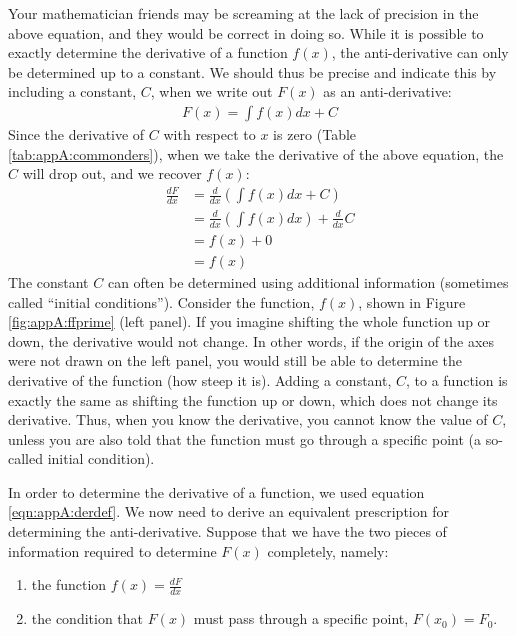 Your mathematician friends may be screaming at the lack of precision in the above equation, and they would be correct in doing so. While it is possible to exactly determine the derivative of a function $f(x)$, the anti-derivative can only be determined up to a constant. We should thus be precise and indicate this by including a constant, $C$, when we write out $F(x)$ as an anti-derivative:
\begin{align}
\label{eqn:appA:antiderDef}
F(x) = \int f(x) dx + C
\end{align}
Since the derivative of $C$ with respect to $x$ is zero (Table \ref{tab:appA:commonders}), when we take the derivative of the above equation, the $C$ will drop out, and we recover $f(x)$:
\begin{align*}
\frac{dF}{dx}&= \frac{d}{dx}\left(\int f(x) dx+C\right)\\
&=\frac{d}{dx}\left(\int f(x) dx\right) +\frac{d}{dx}C\\
&=f(x) + 0\\
&=f(x)
\end{align*}
The constant $C$ can often be determined using additional information (sometimes called ``initial conditions''). Consider the function, $f(x)$, shown in Figure \ref{fig:appA:ffprime} (left panel). If you imagine shifting the whole function up or down, the derivative would not change. In other words, if the origin of the axes were not drawn on the left panel, you would still be able to determine the derivative of the function (how steep it is). Adding a constant, $C$, to a function is exactly the same as shifting the function up or down, which does not change its derivative. Thus, when you know the derivative, you cannot know the value of $C$, unless you are also told that the function must go through a specific point (a so-called initial condition).

In order to determine the derivative of a function, we used equation \ref{eqn:appA:derdef}. We now need to derive an equivalent prescription for determining the anti-derivative. Suppose that we have the two pieces of information required to determine $F(x)$ completely, namely:
\begin{enumerate}
\item the function $f(x)=\frac{dF}{dx}$
\item the condition that $F(x)$ must pass through a specific point, $F(x_0)=F_0$.
\end{enumerate}

